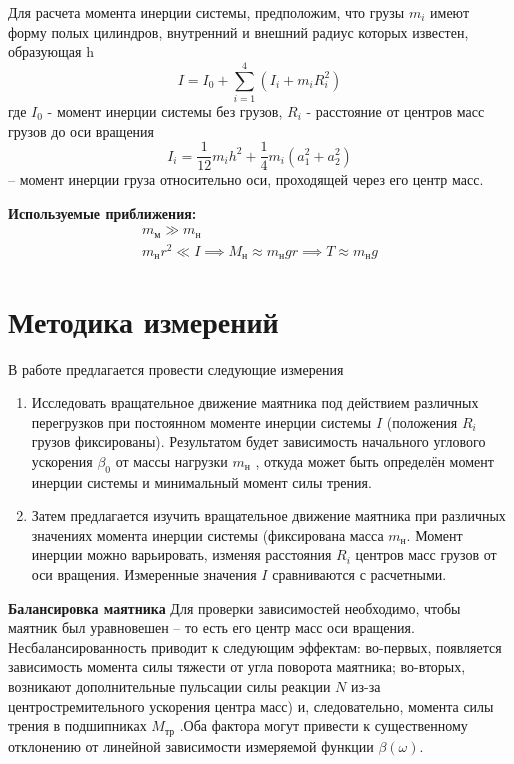 \documentclass[a4paper,12pt]{article} %
\begin{document}
Для расчета момента инерции системы, предположим, что грузы $m_i$ имеют форму полых цилиндров, внутренний и внешний радиус которых известен, образующая h
\begin{equation}
I = I_0 + \sum_{i=1}^4(I_i+m_iR_i^2)
\label{I}
\end{equation}
где $I_0$ - момент инерции системы без грузов, $R_i$ -  расстояние от центров масс грузов до оси вращения
\begin{equation}
I_i = \frac{1}{12}m_ih^2+\frac{1}{4}m_i(a_1^2+a_2^2)
\label{Ii}
\end{equation} -- момент инерции груза относительно оси, проходящей через его центр масс.

\textbf{Используемые приближения:} 
\begin{gather}
	m_\text{м} \gg m_\text{н} \\ 
	m_\text{н} r^2 \ll I \implies M_\text{н} \approx m_\text{н}gr \implies T \approx m_\text{н}g
\end{gather} 
\newpage
\section{Методика измерений}
В работе предлагается провести следующие измерения
\begin{enumerate}
	\item  Исследовать вращательное движение маятника под действием
	различных перегрузков при постоянном моменте инерции системы $ I $ (положения $ R_i $ грузов фиксированы).
	Результатом будет зависимость начального углового ускорения $ \beta_0 $ от массы нагрузки $ m_ \text{н} $ , откуда  может быть определён момент инерции системы 
	и минимальный момент силы трения.
	\item Затем предлагается изучить вращательное движение маятника при различных значениях момента инерции системы (фиксирована
	масса $ m_ \text{н} $. Момент инерции можно варьировать, изменяя расстояния $ R_i $ центров масс грузов от оси вращения. Измеренные значения
	 $ I $ сравниваются с расчетными.
\end{enumerate}
\textbf{Балансировка маятника} Для проверки зависимостей необходимо, чтобы маятник был уравновешен -- то есть его центр масс
оси вращения. Несбалансированность приводит к следующим эффектам: во-первых, появляется
зависимость момента силы тяжести от угла поворота маятника; во-вторых, возникают дополнительные пульсации силы реакции $ N $ из-за центростремительного ускорения центра масс)
и, следовательно, момента силы трения в подшипниках $ M_ \text{тр} $ .Оба
фактора могут привести к существенному отклонению от линейной зависимости измеряемой функции $ \beta(\omega) $.
\end{document}
